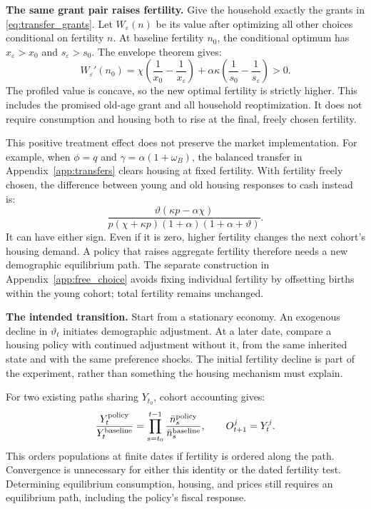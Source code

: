 \documentclass[11pt]{article}
\begin{document}
\textbf{The same grant pair raises fertility.} Give the household exactly
the grants in \eqref{eq:transfer_grants}. Let $W_\varepsilon(n)$ be its
value after optimizing all other choices conditional on fertility $n$.
At baseline fertility $n_0$, the conditional optimum has
$x_\varepsilon>x_0$ and $s_\varepsilon>s_0$. The envelope theorem gives:
\begin{equation}
W_\varepsilon'(n_0)=
\chi\left(\frac1{x_0}-\frac1{x_\varepsilon}\right)
+\alpha\kappa\left(\frac1{s_0}-\frac1{s_\varepsilon}\right)>0.
\label{eq:grant_pair_fertility}
\end{equation}
The profiled value is concave, so the new optimal fertility is strictly
higher. This includes the promised old-age grant and all household
reoptimization. It does not require consumption and housing both to rise
at the final, freely chosen fertility.

This positive treatment effect does not preserve the market implementation.
For example, when $\phi=q$ and $\gamma=\alpha(1+\omega_B)$, the balanced
transfer in Appendix~\ref{app:transfers} clears housing at fixed fertility.
With fertility freely chosen, the difference between young and old housing
responses to cash instead is:
\begin{equation}
\frac{\vartheta(\kappa p-\alpha\chi)}
{p(\chi+\kappa p)(1+\alpha)(1+\alpha+\vartheta)}.
\end{equation}
It can have either sign. Even if it is zero, higher fertility changes the
next cohort's housing demand. A policy that raises aggregate fertility
therefore needs a new demographic equilibrium path. The separate construction
in Appendix~\ref{app:free_choice} avoids fixing individual fertility by
offsetting births within the young cohort; total fertility remains unchanged.

\textbf{The intended transition.} Start from a stationary economy. An
exogenous decline in $\vartheta_t$ initiates demographic adjustment. At a
later date, compare a housing policy with continued adjustment without it,
from the same inherited state and with the same preference shocks. The
initial fertility decline is part of the experiment, rather than something
the housing mechanism must explain.

For two existing paths sharing $Y_{t_0}$, cohort accounting gives:
\begin{equation}
\frac{Y_t^{\rm policy}}{Y_t^{\rm baseline}}
=\prod_{s=t_0}^{t-1}
\frac{\bar n_s^{\rm policy}}{\bar n_s^{\rm baseline}},
\qquad O_{t+1}^j=Y_t^j.
\label{eq:population_path}
\end{equation}
This orders populations at finite dates if fertility is ordered along the
path. Convergence is unnecessary for either this identity or the dated
fertility test. Determining equilibrium consumption, housing, and prices
still requires an equilibrium path, including the policy's fiscal response.
\end{document}

